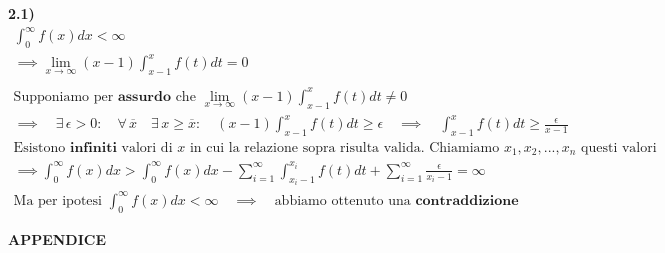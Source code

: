 \documentclass[11pt,reqno]{amsart}
\begin{document}
{\bf 2.1)}
\begin{gather*}
 \int_{0}^{\infty} f(x)dx < \infty\\
 \implies \lim_{x \to \infty} (x-1) \int_{x-1}^{x} f(t)dt = 0\\\\
 \text{Supponiamo per } \textbf{assurdo} \text{ che } \lim_{x \to \infty} (x-1) \int_{x-1}^{x} f(t)dt \neq 0\\
 \implies \quad \exists \, \epsilon > 0: \quad \forall \, \overline{x} \quad \exists \, x \geq \overline{x}: \quad (x-1) \int_{x-1}^{x} f(t)dt \geq \epsilon \quad \implies \quad \int_{x-1}^{x} f(t)dt \geq \frac{\epsilon}{x-1}\\
 \text{Esistono } \textbf{infiniti} \text{ valori di } x \text{ in cui la relazione sopra risulta valida. Chiamiamo } x_1, x_2, ..., x_n \text{ questi valori}\\
 \implies \int_{0}^{\infty} f(x)dx > \int_{0}^{\infty} f(x)dx - \sum_{i = 1}^{\infty} \int_{x_i-1}^{x_i} f(t)dt + \sum_{i = 1}^{\infty} \frac{\epsilon}{x_i-1} = \infty\\
 \text{Ma per ipotesi } \int_{0}^{\infty} f(x)dx < \infty \quad \implies \quad \text{abbiamo ottenuto una } \textbf{contraddizione}
\end{gather*}

\newpage

\centerline{\bf APPENDICE }
\end{document}
